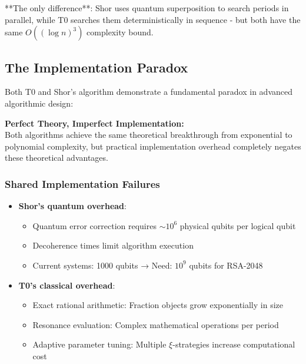 \documentclass[12pt,a4paper]{article}
\begin{document}
	**The only difference**: Shor uses quantum superposition to search periods in parallel, while T0 searches them deterministically in sequence - but both have the same $O((\log n)^3)$ complexity bound.
	
	\subsection{The Implementation Paradox}
	
	Both T0 and Shor's algorithm demonstrate a fundamental paradox in advanced algorithmic design:
	
	\begin{tcolorbox}[colback=yellow!10,colframe=orange!50,title=Core Problem]
		\textbf{Perfect Theory, Imperfect Implementation:} \\
		Both algorithms achieve the same theoretical breakthrough from exponential to polynomial complexity, but practical implementation overhead completely negates these theoretical advantages.
	\end{tcolorbox}
	
	\subsubsection{Shared Implementation Failures}
	\begin{itemize}
		\item \textbf{Shor's quantum overhead}: 
		\begin{itemize}
			\item Quantum error correction requires $\sim 10^6$ physical qubits per logical qubit
			\item Decoherence times limit algorithm execution
			\item Current systems: 1000 qubits → Need: $10^9$ qubits for RSA-2048
		\end{itemize}
		
		\item \textbf{T0's classical overhead}:
		\begin{itemize}
			\item Exact rational arithmetic: Fraction objects grow exponentially in size
			\item Resonance evaluation: Complex mathematical operations per period
			\item Adaptive parameter tuning: Multiple $\xi$-strategies increase computational cost
		\end{itemize}
	\end{itemize}
	
\end{document}
